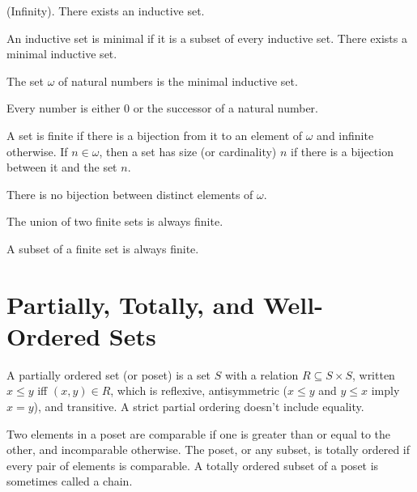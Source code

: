 \documentclass{report}
\begin{document}
\begin{axiom}
  {\normalfont (Infinity).} There exists an inductive set.
\end{axiom}

\begin{theorem}
  An inductive set is minimal if it is a subset of every inductive set. There exists a minimal inductive set.
\end{theorem}

\begin{definition}
  The set $\omega$ of natural numbers is the minimal inductive set.
\end{definition}

\begin{lemma}
  Every number is either 0 or the successor of a natural number.
\end{lemma}

\begin{definition}
  A set is finite if there is a bijection from it to an element of $\omega$ and infinite  otherwise. If $n \in \omega$, then a set has size (or cardinality) $n$ if there is a bijection between it and the set $n$.
\end{definition}

\begin{proposition}
  There is no bijection between distinct elements of $\omega$.
\end{proposition}

\begin{proposition}
  The union of two finite sets is always finite.
\end{proposition}

\begin{proposition}
  A subset of a finite set is always finite.
\end{proposition}

 \newpage
\section{Partially, Totally, and Well-Ordered Sets}
\begin{definition}
  A partially ordered set (or poset) is a set $S$ with a relation $R \subseteq S \times S$, written $x \leq y$ iff $(x,y) \in R$, which is reflexive, antisymmetric ($x \leq y$ and $y \leq x$ imply $x = y$), and transitive. A strict partial ordering doesn't include equality. 
\end{definition}

\begin{definition}
 Two elements in a poset are comparable if one is greater than or equal to the other, and incomparable otherwise. The poset, or any subset, is totally ordered if every pair of elements is comparable. A totally ordered subset of a poset is sometimes called a chain.
\end{definition}
\end{document}

